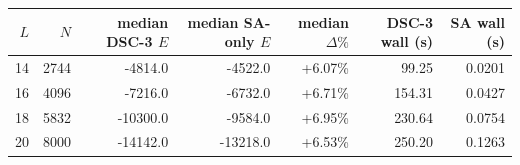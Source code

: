 \begin{tabular}{rrrrrrr}
\toprule
$L$ & $N$ & median DSC-3 $E$ & median SA-only $E$ & median $\Delta\%$ & DSC-3 wall (s) & SA wall (s) \\
\midrule
14 & 2744 & -4814.0 & -4522.0 & +6.07\% & 99.25 & 0.0201 \\
16 & 4096 & -7216.0 & -6732.0 & +6.71\% & 154.31 & 0.0427 \\
18 & 5832 & -10300.0 & -9584.0 & +6.95\% & 230.64 & 0.0754 \\
20 & 8000 & -14142.0 & -13218.0 & +6.53\% & 250.20 & 0.1263 \\
\bottomrule
\end{tabular}
